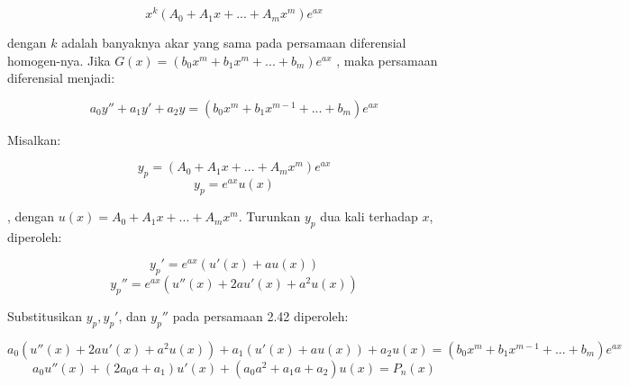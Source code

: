 \begin{enumerate}[1.]
	\begin{equation} x^{k} (A_0 + A_1 x + ... + A_m x^{m}) e^{ax} \end{equation}

	dengan \begin{math} k \end{math} adalah banyaknya akar yang sama pada persamaan diferensial homogen-nya. Jika \begin{math} G(x) = (b_0 x^{m} + b_1 x^{m} + ... + b_m) e^{ax} \end{math} , maka persamaan diferensial menjadi:

	\begin{equation} a_0 y'' + a_1 y' + a_2 y = (b_0 x^{m} + b_1 x^{m - 1} + ... + b_m)e^{ax} \end{equation}

	Misalkan:

	\begin{displaymath} y_p = (A_0 + A_1 x + ... + A_m x^{m})e^{ax} \end{displaymath}
	\begin{displaymath} y_p = e^{ax} u(x) \end{displaymath}

	, dengan \begin{math} u(x) = A_0 + A_1 x + ... + A_m x^{m}  \end{math}. Turunkan \begin{math} y_p \end{math} dua kali terhadap \begin{math} x \end{math}, diperoleh:

	\begin{equation} y_p' = e^{ax} (u'(x) + au(x)) \end{equation}
	\begin{equation} y_p'' = e^{ax} (u''(x) + 2au'(x) + a^{2}u(x)) \end{equation}

	Substitusikan \begin{math} y_p, y_p' \end{math}, dan \begin{math} y_p'' \end{math} pada persamaan 2.42 diperoleh:

	\begin{equation} a_0 (u''(x) + 2au'(x) + a^{2}u(x)) + a_1 (u'(x) + au(x)) + a_2 u(x) = (b_0 x^{m} + b_1 x^{m - 1} + ... + b_m) e^{ax} \end{equation}
	\begin{equation} a_0 u''(x) + (2 a_0 a + a_1) u'(x) + (a_0 a^{2} + a_1 a + a_2) u(x) = P_n (x) \end{equation}


\end{enumerate}
